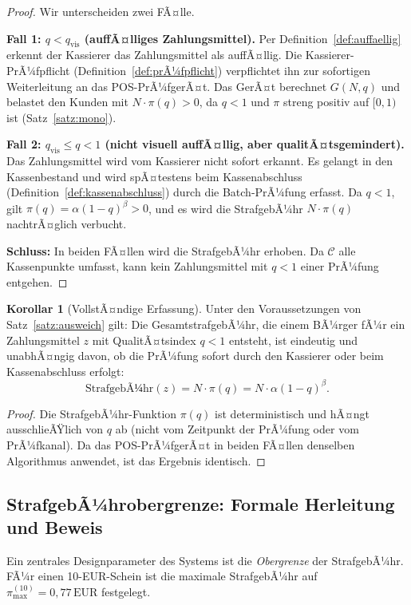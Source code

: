 ﻿\documentclass[a4paper,12pt]{article}
\theoremstyle{definition}
\newtheorem{korollar}{Korollar}
\begin{document}
\begin{proof}
Wir unterscheiden zwei FÃ¤lle.

\textbf{Fall 1: $q < q_{\text{vis}}$ (auffÃ¤lliges Zahlungsmittel).}
Per Definition~\ref{def:auffaellig} erkennt der Kassierer das Zahlungsmittel
als auffÃ¤llig.  Die Kassierer-PrÃ¼fpflicht (Definition~\ref{def:prÃ¼fpflicht})
verpflichtet ihn zur sofortigen Weiterleitung an das POS-PrÃ¼fgerÃ¤t.
Das GerÃ¤t berechnet $G(N, q)$ und belastet den Kunden mit $N \cdot \pi(q) > 0$,
da $q < 1$ und $\pi$ streng positiv auf $[0,1)$ ist (Satz~\ref{satz:mono}).

\textbf{Fall 2: $q_{\text{vis}} \leq q < 1$ (nicht visuell auffÃ¤llig,
aber qualitÃ¤tsgemindert).}
Das Zahlungsmittel wird vom Kassierer nicht sofort erkannt.
Es gelangt in den Kassenbestand und wird spÃ¤testens beim Kassenabschluss
(Definition~\ref{def:kassenabschluss}) durch die Batch-PrÃ¼fung erfasst.
Da $q < 1$, gilt $\pi(q) = \alpha(1-q)^{\beta} > 0$, und es wird die
StrafgebÃ¼hr $N \cdot \pi(q)$ nachtrÃ¤glich verbucht.

\textbf{Schluss:} In beiden FÃ¤llen wird die StrafgebÃ¼hr erhoben.
Da $\mathcal{C}$ alle Kassenpunkte umfasst, kann kein Zahlungsmittel
mit $q < 1$ einer PrÃ¼fung entgehen.
\end{proof}

\begin{korollar}[VollstÃ¤ndige Erfassung]
\label{kor:vollstÃ¤ndig}
Unter den Voraussetzungen von Satz~\ref{satz:ausweich} gilt:
Die GesamtstrafgebÃ¼hr, die einem BÃ¼rger fÃ¼r ein Zahlungsmittel $z$
mit QualitÃ¤tsindex $q < 1$ entsteht, ist eindeutig und unabhÃ¤ngig davon,
ob die PrÃ¼fung sofort durch den Kassierer oder beim Kassenabschluss erfolgt:
\[
\text{StrafgebÃ¼hr}(z) = N \cdot \pi(q) = N \cdot \alpha(1-q)^{\beta}.
\]
\end{korollar}

\begin{proof}
Die StrafgebÃ¼hr-Funktion $\pi(q)$ ist deterministisch und hÃ¤ngt ausschlieÃŸlich
von $q$ ab (nicht vom Zeitpunkt der PrÃ¼fung oder vom PrÃ¼fkanal).
Da das POS-PrÃ¼fgerÃ¤t in beiden FÃ¤llen denselben Algorithmus anwendet,
ist das Ergebnis identisch.
\end{proof}

\subsection{StrafgebÃ¼hrobergrenze: Formale Herleitung und Beweis}

Ein zentrales Designparameter des Systems ist die \emph{Obergrenze} der
StrafgebÃ¼hr.  FÃ¼r einen 10-EUR-Schein ist die maximale StrafgebÃ¼hr auf
$\pi_{\max}^{(10)} = 0{,}77\,\text{EUR}$ festgelegt.
\end{document}
